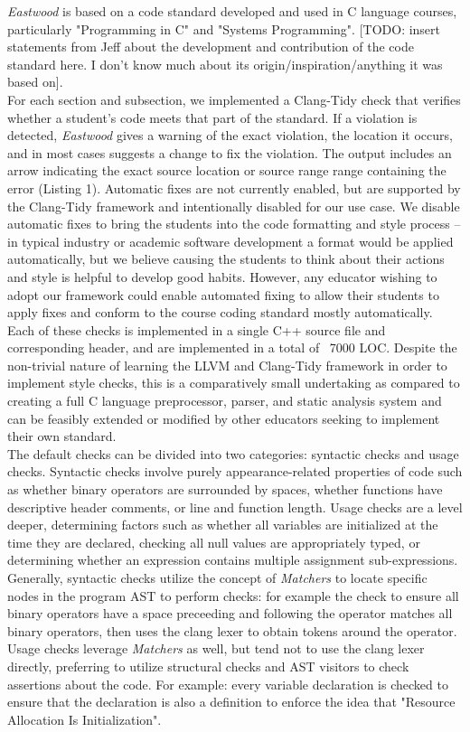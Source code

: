 \documentclass[sigconf]{acmart}
\begin{document}
\textit{Eastwood} is based on a code standard developed and used in C language courses,
particularly "Programming in C" and "Systems Programming".
[TODO: insert statements from Jeff about the development and contribution of the code standard here.
I don't know much about its origin/inspiration/anything it was based on].
\\

For each section and subsection, we implemented a Clang-Tidy check that verifies
whether a student's code meets that part of the standard. If a violation is detected,
\textit{Eastwood} gives a warning of the exact violation, the location it occurs, and in
most cases suggests a change to fix the violation. The output includes an arrow
indicating the exact source location or source range range containing the error
(Listing 1). Automatic fixes are not currently enabled, but are supported by the
Clang-Tidy framework and intentionally disabled for our use case. We disable automatic
fixes to bring the students into the code formatting and style process -- in typical
industry or academic software development a format would be applied automatically, but
we believe causing the students to think about their actions and style is helpful to
develop good habits. However, any educator wishing to adopt our framework could
enable automated fixing to allow their students to apply fixes and conform to the course
coding standard mostly automatically. Each of these checks is implemented in a single
C++ source file and corresponding header, and are implemented in a total of ~7000 LOC.
Despite the non-trivial nature of learning the LLVM and Clang-Tidy framework in order to
implement style checks, this is a comparatively small undertaking as compared to
creating a full C language preprocessor, parser, and static analysis system and can be
feasibly extended or modified by other educators seeking to implement their own
standard.
\\

The default checks can be divided into two categories: syntactic checks and usage
checks. Syntactic checks involve purely appearance-related properties of code such as
whether binary operators are surrounded by spaces, whether functions have descriptive
header comments, or line and function length. Usage checks are a level deeper,
determining factors such as whether all variables are initialized at the time they are
declared, checking all null values are appropriately typed, or determining whether an
expression contains multiple assignment sub-expressions. Generally, syntactic checks
utilize the concept of \textit{Matchers} to locate specific nodes in the program AST to
perform checks: for example the check to ensure all binary operators have a space
preceeding and following the operator matches all binary operators, then uses the clang
lexer to obtain tokens around the operator. Usage checks leverage \textit{Matchers} as
well, but tend not to use the clang lexer directly, preferring to utilize structural
checks and AST visitors to check assertions about the code. For example: every variable
declaration is checked to ensure that the declaration is also a definition to enforce
the idea that "Resource Allocation Is Initialization".
\\
\end{document}
